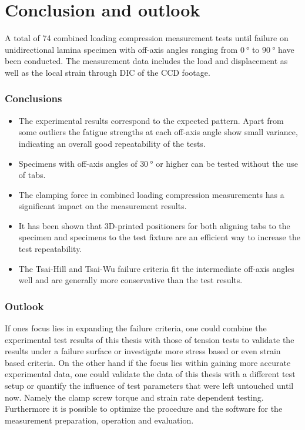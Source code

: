 \chapter{Conclusion and outlook}
\label{chap:\currfilebase}

A total of 74 combined loading compression measurement tests until failure on unidirectional lamina specimen with off-axis angles ranging from $\SI{0}{\degree}$ to $\SI{90}{\degree}$ have been conducted. The measurement data includes the load and displacement as well as the local strain through DIC of the CCD footage.

\subsection*{Conclusions}
\begin{itemize}
    \item The experimental results correspond to the expected pattern. Apart from some outliers the fatigue strengths at each off-axis angle show small variance, indicating an overall good repeatability of the tests.
    \item Specimens with off-axis angles of $\SI{30}{\degree}$ or higher can be tested without the use of tabs.
    \item The clamping force in combined loading compression measurements has a significant impact on the measurement results.
    \item It has been shown that 3D-printed positioners for both aligning tabs to the specimen and specimens to the test fixture are an efficient way to increase the test repeatability.
    \item The Tsai-Hill and Tsai-Wu failure criteria fit the intermediate off-axis angles well and are generally more conservative than the test results.
\end{itemize}

\subsection*{Outlook}
If ones focus lies in expanding the failure criteria, one could combine the experimental test results of this thesis with those of tension tests to validate the results under a failure surface or investigate more stress based or even strain based criteria. On the other hand if the focus lies within gaining more accurate experimental data, one could validate the data of this thesis with a different test setup or quantify the influence of test parameters that were left untouched until now. Namely the clamp screw torque and strain rate dependent testing. Furthermore it is possible to optimize the procedure and the software for the measurement preparation, operation and evaluation.


